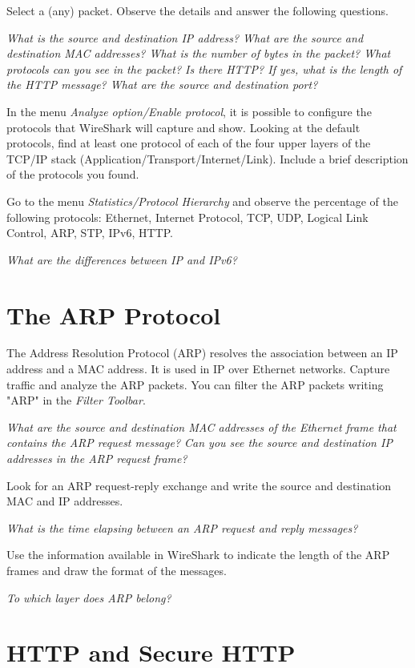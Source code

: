 Select a (any) packet. Observe the details and answer the following questions.

\emph{What is the source and destination IP address? What are the source and destination MAC addresses? What is the number of bytes in the packet? What protocols can you see in the packet? Is there HTTP? If yes, what is the length of the HTTP message? What are the source and destination port?}

In the menu \emph{Analyze option/Enable protocol}, it is possible to configure the protocols that WireShark will capture and show. Looking at the default protocols, find at least one protocol of each of the four upper layers of the TCP/IP stack (Application/Transport/Internet/Link). Include a brief description of the protocols you found.

Go to the menu \emph{Statistics/Protocol Hierarchy} and observe the percentage of the following protocols: Ethernet, Internet Protocol, TCP, UDP, Logical Link Control, ARP, STP, IPv6, HTTP.

\emph{What are the differences between IP and IPv6?}

\section{The ARP Protocol}

The Address Resolution Protocol (ARP) resolves the association between an IP address and a MAC address. It is used in IP over Ethernet networks. Capture traffic and analyze the ARP packets. You can filter the ARP packets writing "ARP" in the \emph{Filter Toolbar}.

\emph{What are the source and destination MAC addresses of the Ethernet frame that contains the ARP request message? Can you see the source and destination IP addresses in the ARP request frame?}

Look for an ARP request-reply exchange and write the source and destination MAC and IP addresses.

\emph{What is the time elapsing between an ARP request and reply messages?}

Use the information available in WireShark to indicate the length of the ARP frames and draw the format of the messages.

\emph{To which layer does ARP belong?}

\section{HTTP and Secure HTTP}

